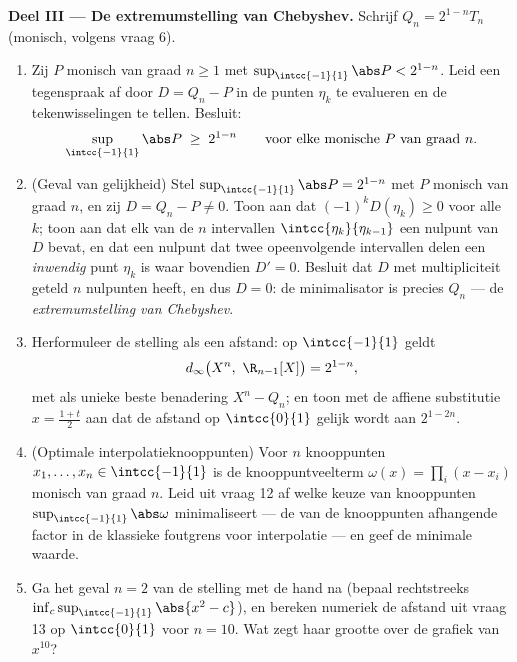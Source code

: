 \begin{problem}
\medskip
\noindent\textbf{Deel III --- De extremumstelling van Chebyshev.}
Schrijf $Q_n = 2^{1-n}T_n$ (monisch, volgens vraag 6).
\begin{enumerate}[resume]
  \item Zij $P$ monisch van graad $n \geq 1$ met
        $\sup_{\intcc{-1}{1}}\abs P < 2^{1-n}$. Leid een
        tegenspraak af door $D = Q_n - P$ in de punten $\eta_k$ te
        evalueren en de tekenwisselingen te tellen. Besluit:
        \[
        \sup_{\intcc{-1}{1}}\abs P \;\geq\; 2^{1-n}
        \qquad\text{voor elke monische } P \text{ van graad } n.
        \]
  \item (Geval van gelijkheid) Stel $\sup_{\intcc{-1}{1}}\abs P =
        2^{1-n}$ met $P$ monisch van graad $n$, en zij $D = Q_n -
        P \neq 0$. Toon aan dat $(-1)^kD(\eta_k) \geq 0$ voor alle
        $k$; toon aan dat elk van de $n$ intervallen
        $\intcc{\eta_{k}}{\eta_{k-1}}$ een nulpunt van $D$ bevat,
        en dat een nulpunt dat twee opeenvolgende intervallen
        delen een \emph{inwendig} punt $\eta_k$ is waar bovendien
        $D' = 0$. Besluit dat $D$ met multipliciteit geteld $n$
        nulpunten heeft, en dus $D = 0$: de minimalisator is
        precies $Q_n$ --- de \emph{extremumstelling van
        Chebyshev}.
  \item Herformuleer de stelling als een afstand: op
        $\intcc{-1}{1}$ geldt
        \[
        d_\infty\bigl(X^n,\ \R_{n-1}[X]\bigr) = 2^{1-n},
        \]
        met als unieke beste benadering $X^n - Q_n$; en toon met de
        affiene substitutie $x = \frac{1+t}2$ aan dat de afstand op
        $\intcc{0}{1}$ gelijk wordt aan $2^{1-2n}$.
  \item (Optimale interpolatieknooppunten) Voor $n$ knooppunten
        $x_1, \dots, x_n \in \intcc{-1}{1}$ is de
        knooppuntveelterm $\omega(x) = \prod_i(x - x_i)$ monisch
        van graad $n$. Leid uit vraag 12 af welke keuze van
        knooppunten $\sup_{\intcc{-1}{1}}\abs\omega$
        minimaliseert --- de van de knooppunten afhangende factor
        in de klassieke foutgrens voor interpolatie --- en geef de
        minimale waarde.
  \item Ga het geval $n = 2$ van de stelling met de hand na (bepaal
        rechtstreeks $\inf_c \sup_{\intcc{-1}{1}}\abs{x^2 - c}$),
        en bereken numeriek de afstand uit vraag 13 op
        $\intcc{0}{1}$ voor $n = 10$. Wat zegt haar grootte over de
        grafiek van $x^{10}$?
\end{enumerate}


\end{problem}
